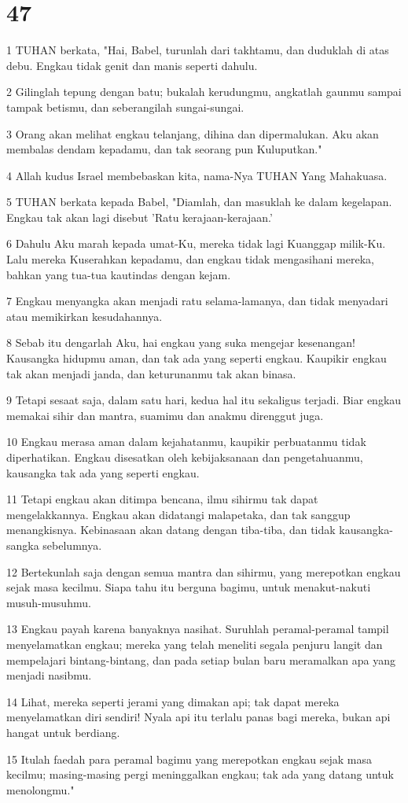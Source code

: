 \chapter{47}

\par 1 TUHAN berkata, "Hai, Babel, turunlah dari takhtamu, dan duduklah di atas debu. Engkau tidak genit dan manis seperti dahulu.
\par 2 Gilinglah tepung dengan batu; bukalah kerudungmu, angkatlah gaunmu sampai tampak betismu, dan seberangilah sungai-sungai.
\par 3 Orang akan melihat engkau telanjang, dihina dan dipermalukan. Aku akan membalas dendam kepadamu, dan tak seorang pun Kuluputkan."
\par 4 Allah kudus Israel membebaskan kita, nama-Nya TUHAN Yang Mahakuasa.
\par 5 TUHAN berkata kepada Babel, "Diamlah, dan masuklah ke dalam kegelapan. Engkau tak akan lagi disebut 'Ratu kerajaan-kerajaan.'
\par 6 Dahulu Aku marah kepada umat-Ku, mereka tidak lagi Kuanggap milik-Ku. Lalu mereka Kuserahkan kepadamu, dan engkau tidak mengasihani mereka, bahkan yang tua-tua kautindas dengan kejam.
\par 7 Engkau menyangka akan menjadi ratu selama-lamanya, dan tidak menyadari atau memikirkan kesudahannya.
\par 8 Sebab itu dengarlah Aku, hai engkau yang suka mengejar kesenangan! Kausangka hidupmu aman, dan tak ada yang seperti engkau. Kaupikir engkau tak akan menjadi janda, dan keturunanmu tak akan binasa.
\par 9 Tetapi sesaat saja, dalam satu hari, kedua hal itu sekaligus terjadi. Biar engkau memakai sihir dan mantra, suamimu dan anakmu direnggut juga.
\par 10 Engkau merasa aman dalam kejahatanmu, kaupikir perbuatanmu tidak diperhatikan. Engkau disesatkan oleh kebijaksanaan dan pengetahuanmu, kausangka tak ada yang seperti engkau.
\par 11 Tetapi engkau akan ditimpa bencana, ilmu sihirmu tak dapat mengelakkannya. Engkau akan didatangi malapetaka, dan tak sanggup menangkisnya. Kebinasaan akan datang dengan tiba-tiba, dan tidak kausangka-sangka sebelumnya.
\par 12 Bertekunlah saja dengan semua mantra dan sihirmu, yang merepotkan engkau sejak masa kecilmu. Siapa tahu itu berguna bagimu, untuk menakut-nakuti musuh-musuhmu.
\par 13 Engkau payah karena banyaknya nasihat. Suruhlah peramal-peramal tampil menyelamatkan engkau; mereka yang telah meneliti segala penjuru langit dan mempelajari bintang-bintang, dan pada setiap bulan baru meramalkan apa yang menjadi nasibmu.
\par 14 Lihat, mereka seperti jerami yang dimakan api; tak dapat mereka menyelamatkan diri sendiri! Nyala api itu terlalu panas bagi mereka, bukan api hangat untuk berdiang.
\par 15 Itulah faedah para peramal bagimu yang merepotkan engkau sejak masa kecilmu; masing-masing pergi meninggalkan engkau; tak ada yang datang untuk menolongmu."

